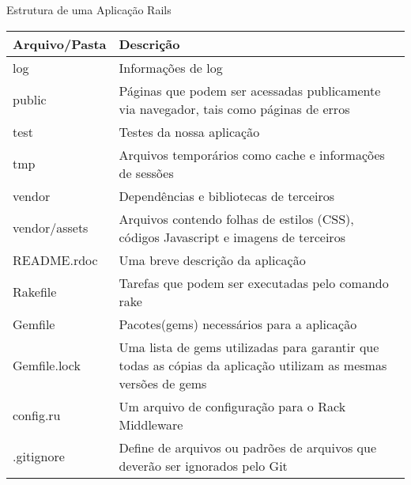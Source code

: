 \begin{frame}{Estrutura de uma Aplicação Rails}
  \begin{table}\centering\scriptsize
    \begin{tabular}{@{}lp{8cm}@{}}\toprule
      \textbf{Arquivo/Pasta} & \textbf{Descrição}	\\ \midrule
      log & Informações de log	\\
      public & Páginas que podem ser acessadas publicamente via navegador, tais como 
	    páginas de erros	\\    
      test & Testes da nossa aplicação	\\
      tmp & Arquivos temporários como cache e informações de sessões	\\
      vendor & Dependências e bibliotecas de terceiros\\
      vendor/assets & Arquivos contendo folhas de estilos (CSS), códigos Javascript e imagens de
	    terceiros\\
      README.rdoc & Uma breve descrição da aplicação\\
      Rakefile & Tarefas que podem ser executadas pelo comando rake	\\
      Gemfile & Pacotes(gems) necessários para a aplicação	\\
      Gemfile.lock & Uma lista de gems utilizadas para garantir que todas as cópias da aplicação
		      utilizam as mesmas versões de gems\\ 
      config.ru & Um arquivo de configuração para o Rack Middleware\\
      .gitignore & Define de arquivos ou padrões de arquivos que deverão ser ignorados pelo Git\\ \bottomrule
    \end{tabular}
  \end{table} 

\end{frame}
